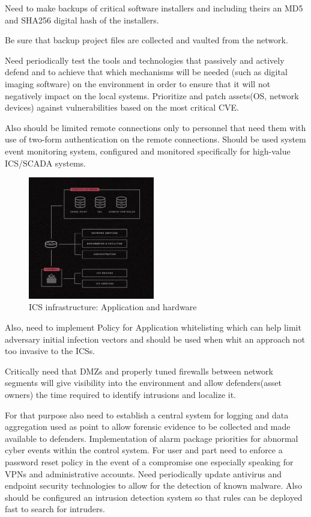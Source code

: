\documentclass[conference]{IEEEtran}
\begin{document}
Need to make backups of critical software installers and including theirs an MD5 and SHA256 digital hash of the installers.

Be sure that backup project files are collected and vaulted from the network.

Need periodically test the tools and technologies that passively and actively defend and to achieve that which mechanisms will be needed (such as digital imaging software) on the environment in order to ensure that it will not negatively impact on the local systems. Prioritize and patch assets(OS, network devices) against vulnerabilities based on the most critical CVE.

Also should be limited remote connections only to personnel that need them with use of two-form authentication on the remote connections. Should be used system event monitoring system, configured and monitored specifically for high-value ICS/SCADA systems.

\begin{figure}[!htb]
	\includegraphics[width=0.49\textwidth]{images/Str_scada.jpg}
	\caption{ICS  infrastructure: Application and hardware }
	\label{fig:fb}
\end{figure}

Also, need to implement Policy for Application whitelisting which can help limit adversary initial infection vectors and should be used when whit an approach not too invasive to the ICSs.

Critically need that DMZs and properly tuned firewalls between network segments will give visibility into the environment and allow defenders(asset owners) the time required to identify intrusions and localize it.

For that purpose also need to establish a central system for logging and data aggregation used as point to allow forensic evidence to be collected and made available to defenders. Implementation of alarm package priorities for abnormal cyber events within the control system. For user and part need to enforce a password reset policy in the event of a compromise one especially speaking for VPNs and administrative accounts. Need periodically update antivirus and endpoint security technologies to allow for the detection of known malware. Also should be configured an intrusion detection system so that rules can be deployed fast to search for intruders.
\end{document}
